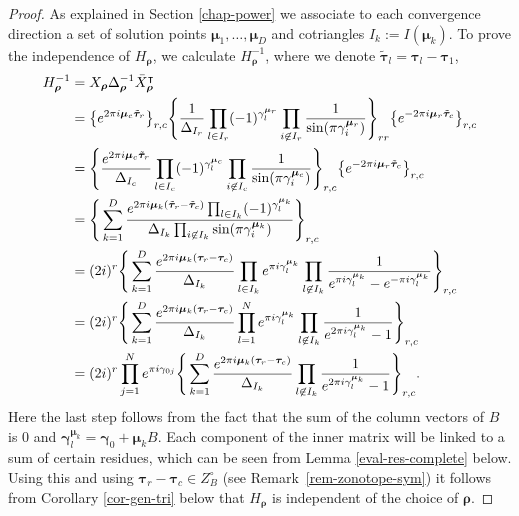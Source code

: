 \documentclass[11pt]{article}
\numberwithin{equation}{section}
\numberwithin{equation}{section}
\begin{document}
\begin{proof}
As explained in Section \ref{chap-power} we associate to each convergence direction a set of solution points $\bm{\mu}_1,\dots,\bm{\mu}_D$ and cotriangles $I_k := I(\bm{\mu}_k).$ To prove the independence of $H_{\bm\rho}$,
we calculate $H^{-1}_{\bm\rho}$, where we denote $\tilde{\bm{\tau}}_l = \bm{\tau}_l - \bm{\tau}_1$,
\begin{align*}
H_{\bm\rho}^{-1}&= X_{\bm\rho} \Delta_{\bm\rho}^{-1} \bar{X}_{\bm\rho}^{\intercal}\\
&= \big\{{\rm e}^{2\pi {\rm i}\bm{\mu}_c \tilde{\bm{\tau}}_r}\big\}_{r,c}
\Bigg\{\frac{1}{\Delta_{I_r}} \prod_{l \in I_r} (-1)^{\gamma_l^{\bm\mu_r}}\prod_{i \not \in I_r} \frac{1}{\sin(\pi \gamma_i^{\bm\mu_r})}\Bigg\}_{rr}
\big\{{\rm e}^{-2\pi {\rm i}\bm{\mu}_r \tilde{\bm{\tau}}_c}\big\}_{r,c}
\\
&= \Bigg\{\frac{{\rm e}^{2\pi {\rm i}\bm{\mu}_c \tilde{\bm{\tau}}_r}}{\Delta_{I_c}} \prod_{l \in I_c} (-1)^{\gamma_l^{\bm\mu_c}}\prod_{i \not \in I_c} \frac{1}{\sin(\pi \gamma_i^{\bm\mu_c})}\Bigg\}_{r,c}
\big\{{\rm e}^{-2\pi {\rm i}\bm{\mu}_r \tilde{\bm{\tau}}_c}\big\}_{r,c}
\\
&= \Bigg\{\sum_{k=1}^D \frac{{\rm e}^{2\pi {\rm i}\bm{\mu}_k (\tilde{\bm{\tau}}_r - \tilde{\bm{\tau}}_c)}\prod_{l \in I_k} (-1)^{\gamma_l^{\bm\mu_k}}}{\Delta_{I_k}\prod_{i \not \in I_k} \sin(\pi \gamma_i^{\bm\mu_k})} \Bigg\}_{r,c}\\
&=(2{\rm i})^r\Bigg\{\sum_{k=1}^D \frac{{\rm e}^{2\pi {\rm i}\bm{\mu}_k (\bm{\tau}_r - \bm{\tau}_c)}}{\Delta_{I_k}}\prod_{l \in I_k} {\rm e}^{\pi {\rm i} \gamma_l^{\bm\mu_k}}\prod_{l \not \in I_k} \frac{1}{{\rm e}^{\pi {\rm i} \gamma_l^{\bm\mu_k}} - {\rm e}^{-\pi {\rm i} \gamma_l^{\bm\mu_k}}} \Bigg\}_{r,c} \\
&= (2{\rm i})^r \Bigg\{\sum_{k=1}^D \frac{{\rm e}^{2\pi {\rm i}\bm{\mu}_k (\bm{\tau}_r - \bm{\tau}_c)}}{\Delta_{I_k}}\prod_{l = 1}^N {\rm e}^{\pi {\rm i} \gamma_l^{\bm\mu_k}}\prod_{l \not \in I_k} \frac{1}{{\rm e}^{2\pi {\rm i} \gamma_l^{\bm\mu_k}} - 1} \Bigg\}_{r,c} \\
&= (2{\rm i})^r \prod_{j=1}^N {\rm e}^{\pi {\rm i} \gamma_{0j}}\Bigg\{\sum_{k=1}^D \frac{{\rm e}^{2\pi {\rm i}\bm{\mu}_k (\bm{\tau}_r - \bm{\tau}_c)}}{\Delta_{I_k}}\prod_{l \not \in I_k} \frac{1}{{\rm e}^{2\pi {\rm i} \gamma_l^{\bm\mu_k}} - 1} \Bigg\}_{r,c}.
\end{align*}
Here the last step follows from the fact that the sum of the column vectors of $B$ is $0$ and $\bm\gamma_l^{\bm \mu_k} = \bm\gamma_0 + \bm{\mu}_kB$.
Each component of the inner matrix will be linked to a sum of certain residues, which can be seen from Lemma \ref{eval-res-complete} below. Using this and using
$\bm{\tau}_{r} - \bm{\tau}_{c} \in Z_B^{\circ}$ (see Remark~\ref{rem-zonotope-sym}) it follows from Corollary \ref{cor-gen-tri} below that $H_{\bm\rho}$ is independent of the choice
of $\bm\rho$.
\end{proof}
\end{document}
